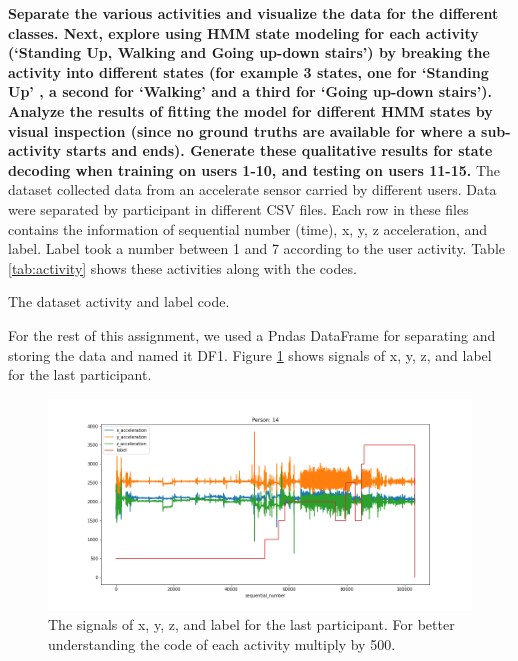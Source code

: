 \item \textbf{Separate the  various  activities  and  visualize  the  data  for  the  different  classes.  Next,  explore  using HMM  state  modeling  for  each activity (‘Standing  Up,  Walking  and  Going  up-down  stairs’)  by breaking  the activity into different states (for example 3 states, one for ‘Standing Up’  ,  a second for ‘Walking’  and a third  for  ‘Going  up-down  stairs’).  Analyze  the  results  of fitting  the  model  for different  HMM  states  by visual  inspection  (since  no  ground  truths  are available for where  a  sub-activity  starts  and  ends).  Generate  these  qualitative  results  for  state  decoding  when training  on  users 1-10, and testing  on users 11-15.}
The dataset collected data from an accelerate sensor carried by different users. Data were separated by participant in different CSV files. Each row in these files contains the information of sequential number (time), x, y, z acceleration, and label. Label took a number between 1 and 7 according to the user activity. Table \ref{tab:activity} shows these activities along with the codes.
\begin{table}[H]
\centering
\caption{The dataset activity and label code.}
\label{tab:activity}

\end{table}
For the rest of this assignment, we used a Pndas DataFrame for separating and storing the data and named it DF1. Figure \ref{fig:Ass3_Q2_raw_signal_2} shows signals of x, y, z, and label for the last participant.
\begin{figure}[H]
    \centering
    \begin{minipage}[b]{1\textwidth}
        \includegraphics[width=\textwidth]{figures/Ass3/Ass3_Q2_raw_signal_2.png}
    \end{minipage}
    \caption{The signals of x, y, z, and label for the last participant. For better understanding the code of each activity multiply by 500.}
    \label{fig:Ass3_Q2_raw_signal_2}
\end{figure}


